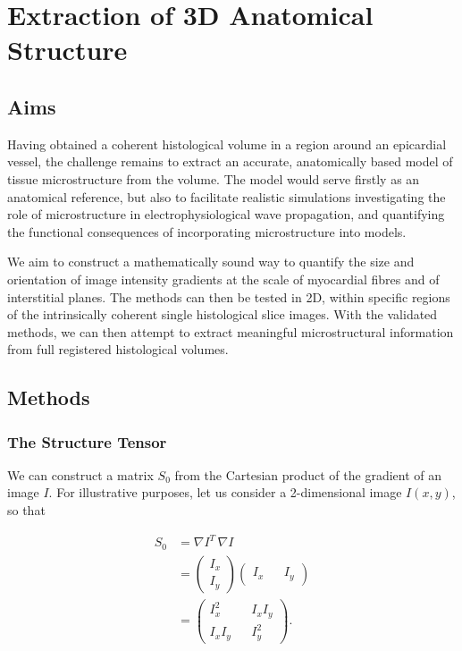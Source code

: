 \chapter{Extraction of 3D Anatomical Structure} %
\label{cha:extraction_of_3d_anatomical_structure}

\dblspace
\begin{quote}{\em }\end{quote}

\section{Aims} %
\label{sec:aims}
  Having obtained a coherent histological volume in a region around an epicardial vessel, the challenge remains to extract an accurate, anatomically based model of tissue microstructure from the volume. The model would serve firstly as an anatomical reference, but also to facilitate realistic simulations investigating the role of microstructure in electrophysiological wave propagation, and quantifying the functional consequences of incorporating microstructure into models.
  
  We aim to construct a mathematically sound way to quantify the size and orientation of image intensity gradients at the scale of myocardial fibres and of interstitial planes. The methods can then be tested in 2D, within specific regions of the intrinsically coherent single histological slice images. With the validated methods, we can then attempt to extract meaningful microstructural information from full registered histological volumes.

\section{Methods} %
\label{sec:methods}
  
  \subsection{The Structure Tensor} %
  \label{sub:the_structure_tensor}
    We can construct a matrix $S_0$ from the Cartesian product of the gradient of an image $I$. For illustrative purposes, let us consider a 2-dimensional image $I(x,y)$, so that
  
    \begin{align}
      S_0 &= \nabla I^T \, \nabla I \\
          &= \begin{pmatrix}
        I_x \\
        I_y
      \end{pmatrix} \begin{pmatrix}
        I_x && I_y
      \end{pmatrix} \\
          &= \begin{pmatrix}
            I_x^2 && I_xI_y \\
            I_xI_y && I_y^2
          \end{pmatrix}.
    \end{align}
  
